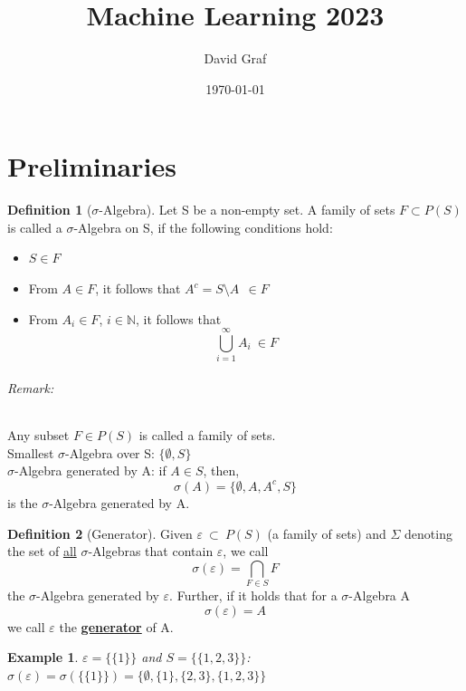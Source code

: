 \documentclass[10pt,a4paper]{article}
\title{Machine Learning 2023}
\author{David Graf}
\date{\today}
\theoremstyle{definition}
\newtheorem{definition}{Definition}[part]
\theoremstyle{plain}
\newtheorem{example}{Example}[definition]
\begin{document}
\maketitle
\part{Preliminaries}
\begin{definition}[$\sigma$-Algebra]
	Let S be a non-empty set. A family of sets $F \subset P(S)$ is called a $\sigma$-Algebra on S, if the following conditions hold:
	\begin{itemize}
		\item $S \in F$
		\item From $ A \in F$, it follows that $A^c = S \setminus A \ \ \in F$
		\item From $ A_i \in F$, $i \in \mathbb{N}$, it follows that $$
			\bigcup_{i=1}^{\infty} A_i \  \in F$$
	\end{itemize}
\end{definition}

\paragraph{Remark:} Any subset $F \in P(S)$ is called a family of sets.\\

Smallest $\sigma$-Algebra over S: $\{\emptyset, S\}$\\

$\sigma$-Algebra generated by A: if $A \in S$, then,$$
\sigma(A) = \{\emptyset, A, A^c, S\}
$$
is the $\sigma$-Algebra generated by A.\\

\begin{definition}[Generator]
	\label{generator}
	Given $\varepsilon \ \subset \ P(S)$ (a family of sets) and $\Sigma$ denoting the set of \underline{all} $\sigma$-Algebras that contain $\varepsilon$, we call\\
	$$\sigma(\varepsilon) = \bigcap_{F \in S} F$$
	the $\sigma$-Algebra generated by $\varepsilon$. Further, if it holds that for a $\sigma$-Algebra A\\
	$$\sigma(\varepsilon) = A$$
	we call $\varepsilon$ the \underline{\textbf{generator}} of A.	
\end{definition}

\begin{example}
$\varepsilon = \big\{ \{1\} \big\}$ and $S = \big\{ \{1, 2, 3\} \big\}$:\\
$\sigma(\varepsilon) = \sigma(\big\{ \{1\} \big\}) = \big\{\emptyset, \{1\}, \{2, 3\}, \{1, 2, 3\} \big\} $
\end{example}
\end{document}
